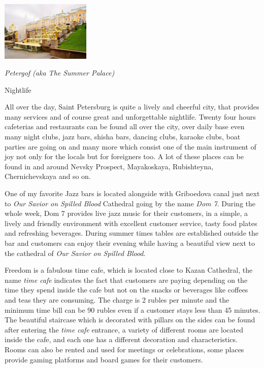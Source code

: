 \documentclass[10pt,a4paper]{article} %
\newcommand{\NewsItem}[1]{ %
\usefont{T1}{fvs}{n}{n} %
\vspace{24pt}\large #1\vspace{3pt} %
\par \normalsize \normalfont}
\begin{document}
\begin{multicols}{3}
\begin{center}
	\includegraphics[width=0.32\textwidth]{media/peterhof.jpg}
	\par\textit{Petergof (aka The Summer Palace)}
\end{center}

\NewsItem{Nightlife}
All over the day, Saint Petersburg is quite a lively and cheerful city, 
that provides many services and of course great and unforgettable nightlife. 
Twenty four hours cafeterias and restaurants can be found all over the city, 
over daily base even many night clubs, jazz bars, shisha bars, dancing clubs, 
karaoke clubs, boat parties are going on and many more which consist one 
of the main instrument of joy not only for the locals but for foreigners too. 
A lot of these places can be found in and around Nevsky Prospect, Mayakoskaya, 
Rubishteyna, Chernichevskaya and so on. 

One of my favorite Jazz bars is located alongside with Griboedova canal just next 
to \textit{Our Savior on Spilled Blood} Cathedral going by the name \textit{Dom 7}. 
During the whole week, Dom 7 provides live jazz music for their customers, 
in a simple, a lively and friendly environment with excellent customer service, 
tasty food plates and refreshing beverages. 
During summer times tables are established outside the bar and customers 
can enjoy their evening while having a beautiful view next to the cathedral 
of \textit{Our Savior on Spilled Blood}.

Freedom is a fabulous time cafe, which is located close to Kazan Cathedral, 
the name \textit{time cafe} indicates the fact that customers are paying depending 
on the time they spend inside the cafe but not on the snacks or beverages 
like coffees and teas they are consuming. 
The charge is 2 rubles per minute and the minimum time bill can be 90 rubles even 
if a customer stays less than 45 minutes. 
The beautiful staircase which is decorated with pillars on the sides 
can be found after entering the {\it time cafe} entrance, a variety of different rooms 
are located inside the cafe, and each one has a different decoration and characteristics. 
Rooms can also be rented and used for meetings or celebrations, 
some places provide gaming platforms and board games for their customers.


\end{multicols}
\end{document}
